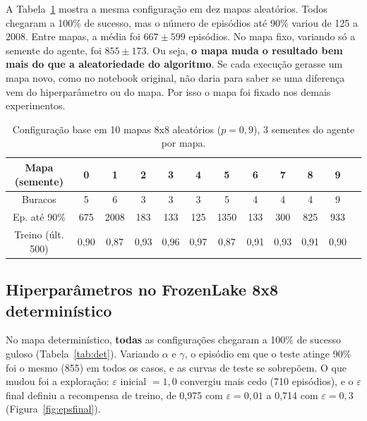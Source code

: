 \documentclass[11pt,a4paper]{article}
\begin{document}
A Tabela~\ref{tab:mapas} mostra a mesma configuração em dez mapas aleatórios. Todos chegaram a 100\% de sucesso, mas
o número de episódios até 90\% variou de 125 a 2008. Entre mapas, a média foi $667 \pm 599$ episódios. No mapa
fixo, variando só a semente do agente, foi $855 \pm 173$. Ou seja, \textbf{o mapa muda o resultado bem mais do que a
aleatoriedade do algoritmo}. Se cada execução gerasse um mapa novo, como no notebook original, não daria para saber
se uma diferença vem do hiperparâmetro ou do mapa. Por isso o mapa foi fixado nos demais experimentos.

\begin{table}[H]
\centering
\small
\caption{Configuração base em 10 mapas 8x8 aleatórios ($p = 0{,}9$), 3 sementes do agente por mapa.}
\label{tab:mapas}
\begin{tabular}{cccccccccccc}
\toprule
Mapa (semente) & 0 & 1 & 2 & 3 & 4 & 5 & 6 & 7 & 8 & 9 \\
\midrule
Buracos & 5 & 6 & 3 & 3 & 3 & 5 & 4 & 4 & 4 & 9 \\
Ep. até 90\% & 675 & 2008 & 183 & 133 & 125 & 1350 & 133 & 300 & 825 & 933 \\
Treino (últ. 500) & 0,90 & 0,87 & 0,93 & 0,96 & 0,97 & 0,87 & 0,91 & 0,93 & 0,91 & 0,90 \\
\bottomrule
\end{tabular}
\end{table}

\subsection*{Hiperparâmetros no FrozenLake 8x8 determinístico}

No mapa determinístico, \textbf{todas} as configurações chegaram a 100\% de sucesso guloso
(Tabela~\ref{tab:det}). Variando $\alpha$ e $\gamma$, o episódio em que o teste atinge 90\% foi o mesmo (855) em
todos os casos, e as curvas de teste se sobrepõem. O que mudou foi a exploração: $\varepsilon$ inicial $= 1{,}0$
convergiu mais cedo (710 episódios), e o $\varepsilon$ final definiu a recompensa de treino, de 0,975 com
$\varepsilon = 0{,}01$ a 0,714 com $\varepsilon = 0{,}3$ (Figura~\ref{fig:epsfinal}).
\end{document}
